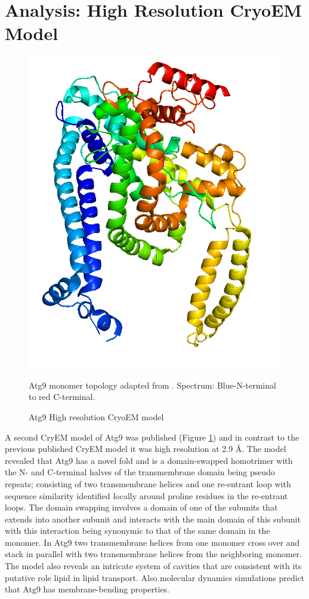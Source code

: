 \section{Analysis: High Resolution CryoEM Model}
\begin{figure}[th!]
    \centering
\includegraphics[width=\linewidth]{Modelling of Atg9/6wqz.png}
    \caption{Atg9 High resolution CryoEM model}
    \label{fig:6wqz}
    \small
    Atg9 monomer topology adapted from \cite{guardia2020structure}. Spectrum: Blue-N-terminal to red C-terminal.
\end{figure}

A second CryEM model of Atg9 was published (Figure \ref{fig:6wqz}) \cite{guardia2020structure} and in contrast to the previous published CryEM model it was high resolution at 2.9 Å.  The model revealed that Atg9 has a novel fold and is a domain-swapped homotrimer with the N- and C-terminal halves of the transmembrane domain being pseudo repeats;  consisting of two transmembrane helices and one re-entrant loop with sequence similarity identified locally around proline residues in the re-entrant loops.  The domain swapping involves  a domain of one of the subunits that extends into another subunit and interacts with the main domain of this subunit with this interaction being synonymic to that of the same domain in the monomer. In Atg9 two transmembrane helices from one monomer cross over and stack in parallel with two transmembrane helices from the neighboring monomer. The model also reveals an intricate system of cavities that are consistent with its putative role lipid in lipid transport.  Also molecular dynamics simulations predict that Atg9 has membrane-bending properties.

